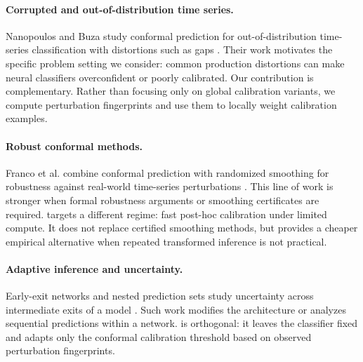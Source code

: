\paragraph{Corrupted and out-of-distribution time series.}
Nanopoulos and Buza study conformal prediction for out-of-distribution time-series classification with distortions such as gaps \citep{nanopoulos2025conformal}. Their work motivates the specific problem setting we consider: common production distortions can make neural classifiers overconfident or poorly calibrated. Our contribution is complementary. Rather than focusing only on global calibration variants, we compute perturbation fingerprints and use them to locally weight calibration examples.

\paragraph{Robust conformal methods.}
Franco et al. combine conformal prediction with randomized smoothing for robustness against real-world time-series perturbations \citep{franco2024guaranteeing}. This line of work is stronger when formal robustness arguments or smoothing certificates are required. \fastcp{} targets a different regime: fast post-hoc calibration under limited compute. It does not replace certified smoothing methods, but provides a cheaper empirical alternative when repeated transformed inference is not practical.

\paragraph{Adaptive inference and uncertainty.}
Early-exit networks and nested prediction sets study uncertainty across intermediate exits of a model \citep{jazbec2024early}. Such work modifies the architecture or analyzes sequential predictions within a network. \fastcp{} is orthogonal: it leaves the classifier fixed and adapts only the conformal calibration threshold based on observed perturbation fingerprints.
